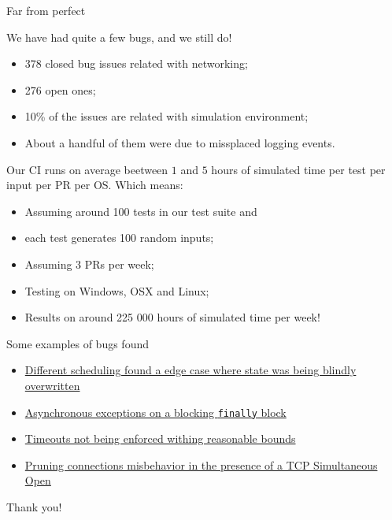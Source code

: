 \documentclass{beamer}
\begin{document}
\begin{frame}{Far from perfect}

  We have had quite a few bugs, and we still do!

  \begin{itemize}
    \item \alert{378 closed bug issues} related with networking;
    \item \alert{276 open ones};
    \item \alert{10\%} of the issues are related with simulation environment;
    \item About a handful of them were due to missplaced logging events.
  \end{itemize}

  Our CI runs on average beetween $1$ and $5$ hours of simulated time per test per input per PR per OS. Which means:

  \begin{itemize}
    \item Assuming around 100 tests in our test suite and
    \item each test generates 100 random inputs;
    \item Assuming 3 PRs per week;
    \item Testing on Windows, OSX and Linux;
    \item Results on around 225 000 hours of simulated time per week!
  \end{itemize}

\end{frame}

\begin{frame}{Some examples of bugs found}

  \begin{itemize}
    \item
      \href{https://github.com/input-output-hk/ouroboros-network/pull/3640/commits/f21334b7630c939a1ef35e452d10956cbf39e3fd}{Different
      scheduling found a edge case where state was being blindly overwritten}
    \vskip0.4cm
    \item
      \href{https://github.com/input-output-hk/ouroboros-network/issues/3572}{Asynchronous
      exceptions on a blocking \texttt{finally} block}
    \vskip0.4cm
    \item
      \href{https://github.com/input-output-hk/ouroboros-network/issues/3553}{Timeouts not
      being enforced withing reasonable bounds}
    \vskip0.4cm
    \item
      \href{https://github.com/input-output-hk/ouroboros-network/issues/3344}{Pruning
      connections misbehavior in the presence of a TCP Simultaneous Open}
  \end{itemize}

\end{frame}

\begin{frame}
  \centering
  Thank you!
\end{frame}
\end{document}
